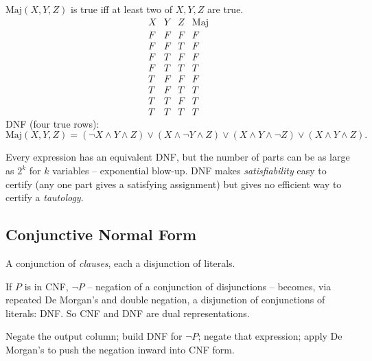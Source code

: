 \bigskip
\begin{example}
$\mathrm{Maj}(X,Y,Z)$ is true iff at least two of $X,Y,Z$ are true.
\[
\begin{array}{ccc|c}
X&Y&Z&\mathrm{Maj}\\\hline
F&F&F&F\\ F&F&T&F\\ F&T&F&F\\ F&T&T&T\\
T&F&F&F\\ T&F&T&T\\ T&T&F&T\\ T&T&T&T
\end{array}
\]
DNF (four true rows):
\[
\mathrm{Maj}(X,Y,Z) = (\neg X\wedge Y\wedge Z)\vee(X\wedge\neg Y\wedge Z)\vee(X\wedge Y\wedge \neg Z)\vee(X\wedge Y\wedge Z).
\]
\end{example}

\begin{note}
Every expression has an equivalent DNF, but the number of parts can be as large as $2^k$ for $k$ variables -- exponential blow-up. DNF makes \emph{satisfiability} easy to certify (any one part gives a satisfying assignment) but gives no efficient way to certify a \emph{tautology}.
\end{note}

\subsection{Conjunctive Normal Form}
\label{sec:4-17}

\begin{definition}[CNF]
A conjunction of \emph{clauses}, each a disjunction of literals.
\end{definition}

\begin{note}
If $P$ is in CNF, $\neg P$ -- negation of a conjunction of disjunctions -- becomes, via repeated De Morgan's and double negation, a disjunction of conjunctions of literals: DNF. So CNF and DNF are dual representations.
\end{note}

\begin{note}
Negate the output column; build DNF for $\neg P$; negate that expression; apply De Morgan's to push the negation inward into CNF form.
\end{note}

